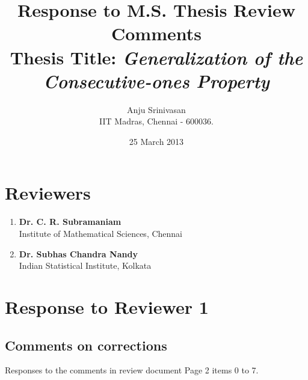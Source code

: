 \documentclass{article}
\begin{document}
\title{Response to M.S. Thesis Review Comments\\ 
 {Thesis Title: {\em Generalization of the Consecutive-ones Property}}}
\author{Anju Srinivasan\\IIT Madras, Chennai - 600036.}
\date{25 March 2013}

\maketitle

\section{Reviewers}

\begin{enumerate}
\item  {\bf Dr. C. R. Subramaniam}\\ Institute of Mathematical Sciences, Chennai
\item  {\bf Dr. Subhas Chandra Nandy}\\ Indian Statistical Institute, Kolkata
\end{enumerate}

\section{Response to Reviewer 1}


\subsection{Comments on corrections}
Responses to the comments in review document Page 2 items 0 to 7.
\end{document}
